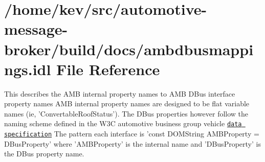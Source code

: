 \hypertarget{ambdbusmappings_8idl}{\section{/home/kev/src/automotive-\/message-\/broker/build/docs/ambdbusmappings.idl File Reference}
\label{ambdbusmappings_8idl}
}


This describes the A\+M\+B internal property names to A\+M\+B D\+Bus interface property names A\+M\+B internal property names are designed to be flat variable names (ie, 'Convertable\+Roof\+Status'). The D\+Bus properties however follow the naming scheme defined in the W3\+C automotive business group vehicle \href{http://w3c.github.io/automotive-bg/data_spec.html}{\tt data specification} The pattern each interface is 'const D\+O\+M\+String A\+M\+B\+Property = D\+Bus\+Property' where 'A\+M\+B\+Property' is the internal name and 'D\+Bus\+Property' is the D\+Bus property name.  


